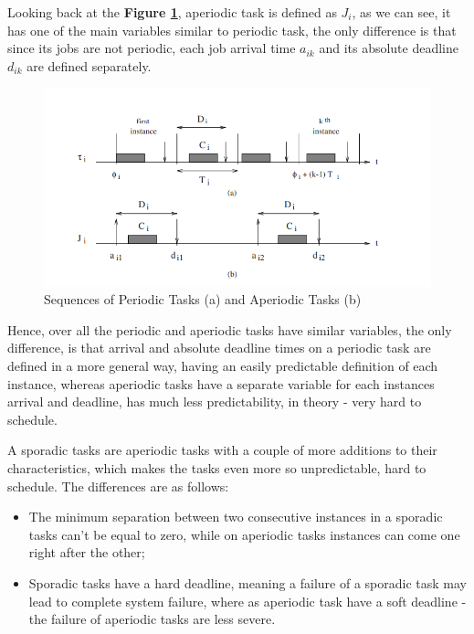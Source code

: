 \documentclass[conference]{IEEEtran}
\begin{document}
Looking back at the \textbf{Figure \ref{tasks}}, aperiodic task is defined as $J_i$, as we can see, it has one of the main variables similar to periodic task, the only difference is that since its jobs are not periodic, each job arrival time $a_{ik}$ and its absolute deadline $d_{ik}$ are defined separately.

\begin{figure}[htbp]
\centerline{\includegraphics[scale=.48]{Tasks.png}}
\caption{Sequences of Periodic Tasks (a) and Aperiodic Tasks (b)}
\label{tasks}
\end{figure}

Hence, over all the periodic and aperiodic tasks have similar variables, the only difference, is that arrival and absolute deadline times on a periodic task are defined in a more general way, having an easily predictable definition of each instance, whereas aperiodic tasks have a separate variable for each instances arrival and deadline, has much less predictability, in theory - very hard to schedule.

A sporadic tasks are aperiodic tasks with a couple of more additions to their characteristics, which makes the tasks even more so unpredictable, hard to schedule. The differences are as follows:

\begin{itemize}
    \item The minimum separation between two consecutive instances in a sporadic tasks can't be equal to zero, while on aperiodic tasks instances can come one right after the other;
    \item Sporadic tasks have a hard deadline, meaning a failure of a sporadic task may lead to complete system failure, where as aperiodic task have a soft deadline - the failure of aperiodic tasks are less severe.
\end{itemize}
\end{document}

